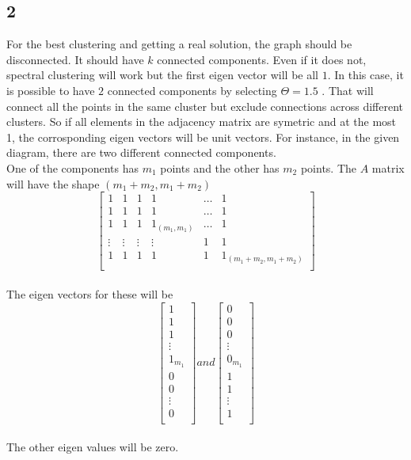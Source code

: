 \documentclass[paper=a4, fontsize=11pt]{scrartcl} %
\numberwithin{figure}{section} %
\numberwithin{table}{section} %
\begin{document}
\subsection*{2}
For the best clustering and getting a real solution, the graph should be disconnected. It should have $k$ connected components. Even if it does not, spectral clustering will work but the first eigen vector will be all $1$. In this case, it is possible to have $2$ connected components by selecting $\Theta = 1.5$ . That will connect all the points in the same cluster but exclude connections across different clusters. So if all elements in the adjacency matrix are symetric and at the most 1, the corrosponding eigen vectors will be unit vectors. For instance, in the given diagram, there are two different connected components.\\
One of the components has $m_{1}$ points and the other has $m_{2}$ points. The $A$ matrix will have the shape $(m_{1}+m_{2},m_{1}+m_{2})$
\[
\begin{bmatrix}
1 & 1 & 1 & 1 & \dots & 1 \\
1 & 1 & 1 & 1 & \dots & 1 \\
1 & 1 & 1 & 1_{(m_{1},m_{1})} & \dots & 1 \\
\vdots & \vdots & \vdots & \vdots & 1 & 1 \\
1 & 1 & 1 & 1 & 1 & 1_{(m_{1}+m_{2},m_{1}+m_{2})} \\
\end{bmatrix}
\]
\\
The eigen vectors for these will be 
\[
\begin{bmatrix}
	1 \\
	1 \\
	1 \\
	\vdots \\
	1_{m_{1}} \\
	0 \\
	0 \\
	\vdots \\
	0 \\
\end{bmatrix}
and 
\begin{bmatrix}
	0 \\
	0 \\
	0 \\
	\vdots \\
	0_{m_{1}} \\
	1 \\
	1 \\
	\vdots \\
	1 \\
\end{bmatrix}
\]\\
The other eigen values will be zero. \\
\end{document}
